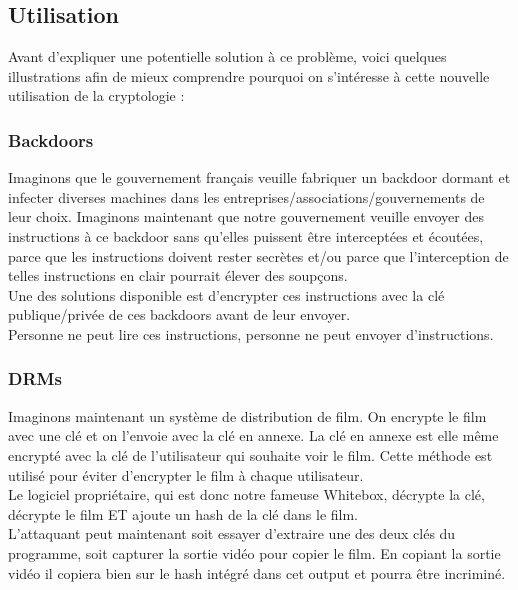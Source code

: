 \documentclass[a4paper,12pt]{article}
\begin{document}
\subsection{Utilisation}

Avant d'expliquer une potentielle solution à ce problème, voici quelques illustrations afin de mieux comprendre pourquoi on s'intéresse à cette nouvelle utilisation de la cryptologie :\\


\subsubsection{Backdoors}

Imaginons que le gouvernement français veuille fabriquer un backdoor dormant et infecter diverses machines dans les entreprises/associations/gouvernements de leur choix. Imaginons maintenant que notre gouvernement veuille envoyer des instructions à ce backdoor sans qu'elles puissent être interceptées et écoutées, parce que les instructions doivent rester secrètes et/ou parce que l'interception de telles instructions en clair pourrait élever des soupçons.\\

Une des solutions disponible est d'encrypter ces instructions avec la clé publique/privée de ces backdoors avant de leur envoyer.\\

Personne ne peut lire ces instructions, personne ne peut envoyer d'instructions.

\subsubsection{DRMs}

Imaginons maintenant un système de distribution de film. On encrypte le film avec une clé et on l'envoie avec la clé en annexe. La clé en annexe est elle même encrypté avec la clé de l'utilisateur qui souhaite voir le film. Cette méthode est utilisé pour éviter d'encrypter le film à chaque utilisateur.\\
Le logiciel propriétaire, qui est donc notre fameuse Whitebox, décrypte la clé, décrypte le film ET ajoute un hash de la clé dans le film.\\
L'attaquant peut maintenant soit essayer d'extraire une des deux clés du programme, soit capturer la sortie vidéo pour copier le film. En copiant la sortie vidéo il copiera bien sur le hash intégré dans cet output et pourra être incriminé.
\end{document}
